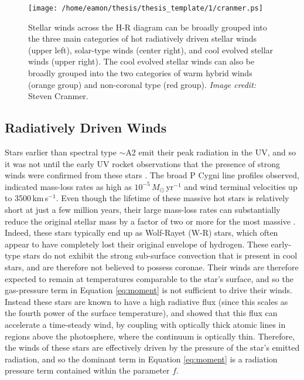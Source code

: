 \begin{figure}[hbt!]
\centering 
          \texttt{[image: /home/eamon/thesis/thesis\_template/1/cranmer.ps]}
\caption[Stellar winds across the H-R diagram]{Stellar winds across the H-R diagram can be broadly grouped into the three main categories of hot radiatively driven stellar winds (upper left), solar-type winds (center right), and cool evolved stellar winds (upper right). The cool evolved stellar winds can also be broadly grouped into the two categories of warm hybrid winds (orange group) and non-coronal type (red group). \textit{Image credit:} Steven Cranmer.}
\label{fig:1.2.3}
\end{figure}

\subsection{Radiatively Driven Winds}\label{sec:1.4.1}
Stars earlier than spectral type $\sim$A2 emit their peak radiation in the UV, and so it was not until the early UV rocket observations that the presence of strong winds were confirmed from these stars \citep[e.g.,][]{morton_1967}. The broad P Cygni line profiles observed, indicated mass-loss rates as high as $10^{-5}\,M_{\odot}$\,yr$^{-1}$ and wind terminal velocities up to 3500\,km\,s$^{-1}$. Even though the lifetime of these massive hot stars is relatively short at just a few million years, their large mass-loss rates can substantially reduce the original stellar mass by a factor of two or more for the most massive \citep{owocki_2004}. Indeed, these stars typically end up as Wolf-Rayet (W-R) stars, which often appear to have completely lost their original envelope of hydrogen. These early-type stars do not exhibit the strong sub-surface convection that is present in cool stars, and are therefore not believed to possess coronae. Their winds are therefore expected to remain at temperatures comparable to the star's surface, and so the gas-pressure term in Equation \ref{eq:moment} is not sufficient to drive their winds. Instead these stars are known to have a high radiative flux (since this scales as the fourth power of the surface temperature), and \cite{castor_1975} showed that this flux can accelerate a time-steady wind, by coupling with optically thick atomic lines in regions above the photosphere, where the continuum is optically thin. Therefore, the winds of these stars are effectively driven by the pressure of the star's emitted radiation, and so the dominant term in Equation \ref{eq:moment} is a radiation pressure term contained within the parameter $f$.

